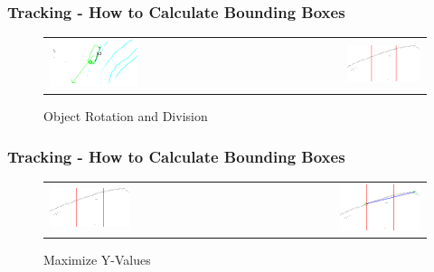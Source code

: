 \documentclass[nosymbols]{beamer}	%
\begin{document}
\begin{frame}
\frametitle{Tracking - How to Calculate Bounding Boxes}
\begin{figure}[!ht]
\caption{Object Rotation and Division}
\begin{tabular}{ l r }
 \includegraphics[width=0.45\textwidth,height=0.7\textheight,keepaspectratio]{bilder/obst_rot.png} &
 \includegraphics[width=0.45\textwidth,height=0.7\textheight,keepaspectratio]{bilder/obst_devide.png}
\end{tabular}
\label{segments}
\end{figure}
\end{frame}



\begin{frame}
\frametitle{Tracking - How to Calculate Bounding Boxes}
\begin{figure}[!ht]
\caption{Maximize Y-Values}
\begin{tabular}{ l r }
 \includegraphics[width=0.45\textwidth,height=0.7\textheight,keepaspectratio]{bilder/obst_devide.png} &
 \includegraphics[width=0.45\textwidth,height=0.7\textheight,keepaspectratio]{bilder/obst_devide_angle.png}
\end{tabular}
\label{segments}
\end{figure}
\end{frame}
\end{document}
